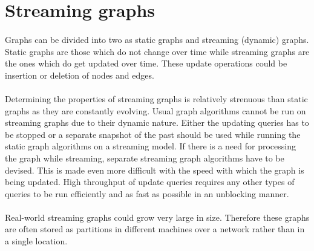 \section{Streaming graphs}

\paragraph{}
Graphs can be divided into two as static graphs and streaming (dynamic) graphs. Static graphs are those which do not change over time while streaming graphs are the ones which do get updated over time. These update operations could be insertion or deletion of nodes and edges.

\paragraph{}
Determining the properties of streaming graphs is relatively strenuous than static graphs as they are constantly evolving. Usual graph algorithms cannot be run on streaming graphs due to their dynamic nature. Either the updating queries has to be stopped or a separate snapshot of the past should be used while running the static graph algorithms on a streaming model. If there is a need for processing the graph while streaming, separate streaming graph algorithms have to be devised\cite{mcgregor_graph_2014}. This is made even more difficult with the speed with which the graph is being updated. High throughput of update queries requires any other types of queries to be run efficiently and as fast as possible in an unblocking manner.

\paragraph{}
Real-world streaming graphs could grow very large in size. Therefore these graphs are often stored as partitions in different machines over a network rather than in a single location.